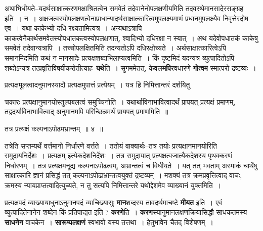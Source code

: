 \documentclass[article,12pt,a4paper]{memoir}
\begin{document}
	  \pstart अथाभिधीयते--यदर्थसाक्षात्करणमक्षाश्रितत्वेन समवेतं तदेवानेनोपलक्षणीयमिति तदवस्थेमानसादेरसङ्ग्रह इति । न । अक्षजत्वस्योपलक्षणत्वेनाप्राधान्यादर्थसाक्षात्कारित्वमुपलक्ष्यमाणं प्रधानमुपलक्ष्यैव निवृत्तेरदोष एव । यथा काकेभ्यो दधि रक्ष्यतामित्यत्र । अन्यथाऽत्रापि काकत्वेनैकार्थसमवेतस्योपधातकत्वस्योपलक्षणात्, श्वादिभ्यो दधिरक्षा न स्यात् । अथ यदेवोपधातकं काकेषु समवेतं तदेवान्यत्रापि । तच्चोपलक्षितमिति तदन्यतोऽपि दधिरक्षोच्यते । अर्थसाक्षात्कारित्वेऽपि समानमिदमिति कथं न मानसादेः प्रत्यक्षशब्दाभिलाप्यत्वमिति । किं दृष्टमिदं यदन्यत्र व्युत्पादितोऽपि शब्दोऽन्यत्र तत्प्रवृत्तिविषयीकरोतीत्याह--\textbf{यथे}ति । सुगममेतत्, केवल\textbf{मपि}रवधारणे \textbf{गोत्वम}  स्मात्परो द्रष्टव्यः ।
	\pend
      

	  \pstart प्रत्यक्षमूलत्वादनुमानस्यादौ प्रत्यक्षमुपात्तं प्रत्येयम् । यत्र हि निमित्तान्तरं दर्शयितु  \leavevmode{} 
	  
	चकारः प्रत्यक्षानुमानयोस्तुल्यबलत्वं समुच्चिनोति । यथार्थाविनाभावित्वादर्थं प्रापयत् प्रत्यक्षं प्रमाणम्, तद्वदर्थाविनाभावित्वाद् अनुमानमपि परिच्छिन्नमर्थं प्रायपत् प्रमाणमिति ॥  
	  
	तत्र प्रत्यक्षं कल्पनाऽपोढमभ्रान्तम् ॥ ४ ॥ 
	  
	तत्रेति सप्तम्यर्थे वर्त्तमानो निर्धारणे वर्त्तते । ततोयं वाक्यार्थः--तत्र तयोः प्रत्यक्षानमानयोरिति समुदायनिर्देशः । प्रत्यक्षम् इत्येकदेशनिर्देशः । तत्र समुदायात् प्रत्यक्षत्वजात्यैकदेशस्य पृथक्करणं निर्धारणम् । तत्र प्रत्यक्षमनूद्य कल्पनाऽपोढत्वम्, अभ्रान्तत्वं च विधीयते । यत् तत् भवताम् अस्माकं चार्थेषु साक्षात्कारि ज्ञानं प्रसिद्धं तत् कल्पनाऽपोढाभ्रान्तत्वयुक्तं द्रष्टव्यम् । मशक्यं तत्र क्रमप्रवृत्तित्वाद् वाचः, क्रमस्य न्यायप्राप्तत्वादित्युच्यते, न तु सत्यपि निमित्तान्तरे यथोद्देशमेव व्याख्यानं युक्तमिति ।
	\pend
      

	  \pstart प्रत्यक्षपदं व्याख्यायाधुनाऽनुमानपदं व्याचिख्यासुः \textbf{मान}शब्दस्य तावदर्थमाचष्टे \textbf{मीयत} इति । एवं व्युत्पादितेनानेन शब्देन किं प्रतिपाद्यत इति ? \textbf{करणे}ति । \textbf{करण}स्यानुमानलक्षणक्रियासिद्धौ साधकतमस्य \textbf{साधनेन} वाचकेन । \textbf{सारूप्यलक्षणं} स्वभावो यस्य तत्तथा । हेतुभावेन चैतद् विशेषणम् ।
	\pend
      
\end{document}

